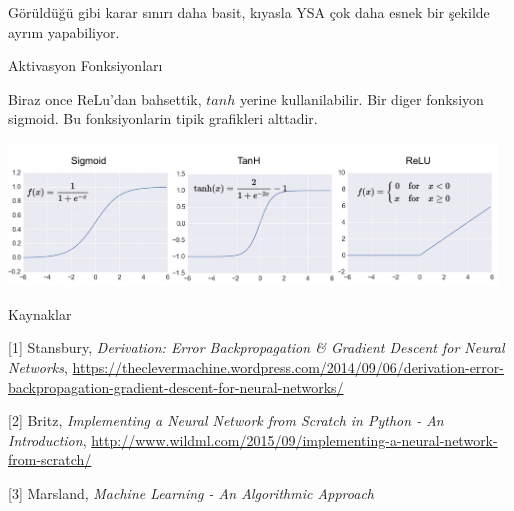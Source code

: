 \documentclass[12pt,fleqn]{article}\usepackage{../../common}
\begin{document}
Görüldüğü gibi karar sınırı daha basit, kıyasla YSA çok daha esnek bir
şekilde ayrım yapabiliyor. 

Aktivasyon Fonksiyonları

Biraz once ReLu'dan bahsettik, $tanh$ yerine kullanilabilir. Bir diger
fonksiyon sigmoid. Bu fonksiyonlarin tipik grafikleri alttadir. 

\includegraphics[width=35em]{mlp_10.png}

Kaynaklar

[1] Stansbury, {\em Derivation: Error Backpropagation \& Gradient Descent for Neural Networks}, \url{https://theclevermachine.wordpress.com/2014/09/06/derivation-error-backpropagation-gradient-descent-for-neural-networks/}

[2] Britz, {\em Implementing a Neural Network from Scratch in Python - An Introduction}, \url{http://www.wildml.com/2015/09/implementing-a-neural-network-from-scratch/}

[3] Marsland, {\em Machine Learning - An Algorithmic Approach}
\end{document}
